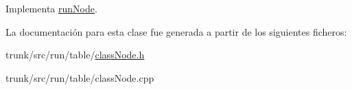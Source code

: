 Implementa \hyperlink{classrunNode_a83c10df8148829b08e04153c93d69eec}{run\-Node}.



La documentación para esta clase fue generada a partir de los siguientes ficheros\-:\begin{DoxyCompactItemize}
\item 
trunk/src/run/table/\hyperlink{classNode_8h}{class\-Node.\-h}\item 
trunk/src/run/table/class\-Node.\-cpp\end{DoxyCompactItemize}
